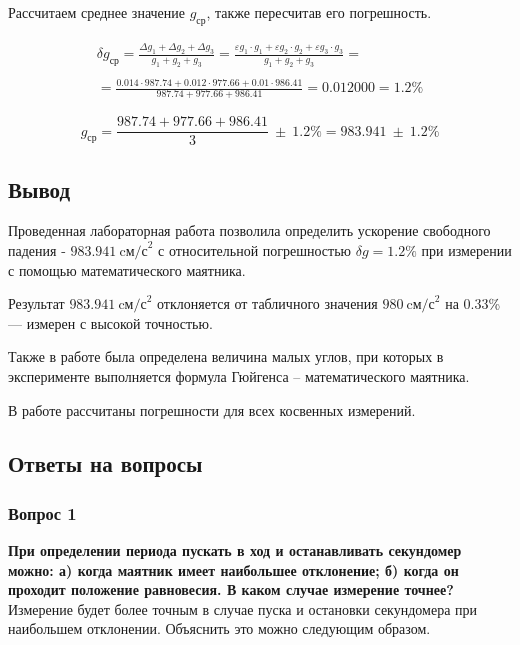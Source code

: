 \documentclass[a4paper,12pt]{article}
\begin{document}
Рассчитаем среднее значение $g_\text{ср}$, также пересчитав его погрешность.

\begin{eqnarray*}
	\delta{g_\text{ср}}=\frac{\Delta{g_1}+\Delta{g_2}+\Delta{g_3}}{g_1+g_2+g_3}=
\frac{\varepsilon{g_1}\cdot{g_1}+\varepsilon{g_2}\cdot{g_2}+\varepsilon{g_3}\cdot{g_3}}{g_1+g_2+g_3}=\\
\\
=\frac{0.014\cdot987.74+0.012\cdot977.66+0.01\cdot986.41}{987.74+977.66+986.41}=0.012000=1.2\%	
\end{eqnarray*}

\begin{equation}
g_\text{ср} = \frac{987.74+977.66+986.41}{3}\ \pm\ 1.2\%=983.941\ \pm\ 1.2\%
\end{equation}

\subsection{Вывод}

Проведенная лабораторная работа позволила определить ускорение свободного падения - 
$983.941\ \text{cм/с}^2$ с относительной погрешностью $\delta{g}=1.2\%$  при измерении с помощью математического маятника. 

Результат $983.941\ \text{cм/с}^2$ отклоняется от табличного значения  $980\ \text{cм/с}^2$ на 0.33\% --- измерен с высокой точностью. 

Также в работе была определена величина малых углов, при которых в эксперименте выполняется формула Гюйгенса -- математического маятника.

В работе рассчитаны погрешности для всех косвенных измерений.

\subsection{Ответы на вопросы}

\subsubsection{Вопрос 1}

\textbf{При определении периода пускать в ход и останавливать секундомер можно: а) когда маятник имеет наибольшее отклонение; б) когда он проходит положение равновесия. В каком случае измерение точнее?}
\\

		Измерение будет более точным в случае  пуска и остановки секундомера при наибольшем отклонении. Объяснить это можно следующим образом.
\end{document}
